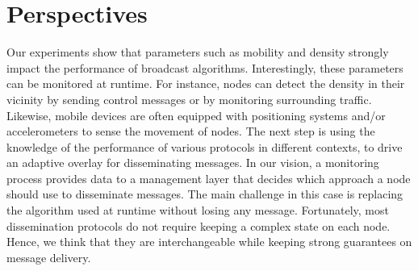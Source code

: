 
\section{Perspectives}
\label{sec:perspectives}

Our experiments show that parameters such as mobility and density strongly impact the performance of broadcast algorithms.
%
Interestingly, these parameters can be monitored at runtime.
%
For instance, nodes can detect the density in their vicinity by sending control messages or by monitoring surrounding traffic.
%
Likewise, mobile devices are often equipped with positioning systems and/or accelerometers to sense the movement of nodes.
%
The next step is using the knowledge of the performance of various protocols in different contexts, to drive an adaptive overlay for disseminating messages.
%
In our vision, a monitoring process provides data to a management layer that decides which approach a node should use to disseminate messages.
%
The main challenge in this case is replacing the algorithm used at runtime without losing any message.
%
Fortunately, most dissemination protocols do not require keeping a complex state on each node.
%
Hence, we think that they are interchangeable while keeping strong guarantees on message delivery.
%


